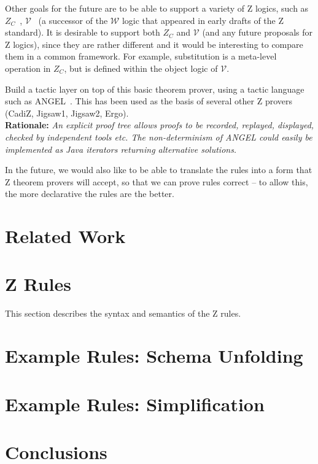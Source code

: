 \documentclass{article}
\newenvironment{Rationale}{\\ \textbf{Rationale:}\it}{}
\begin{document}
Other goals for the future are
to be able to support a variety of Z logics, such as
$Z_C$~\cite{henson:revising-z-1-99,henson:revising-z-2-99}, 
$\mathcal{V}$~\cite{brien:calculus-schemas-z00} (a successor of
the $\mathcal{W}$ logic that appeared in early drafts of the Z standard).
It is desirable to 
    support both $Z_C$ and $\mathcal{V}$ (and any future proposals for Z
    logics), since they are rather different and it would be interesting
    to compare them in a common framework.  For example, substitution
    is a meta-level operation in $Z_C$, but is defined within the object
    logic of $\mathcal{V}$.

Build a tactic layer on top of this basic theorem prover, using a
tactic language such as ANGEL~\cite{martin:tactics}.  This has been
used as the basis of several other Z provers (CadiZ, Jigsaw1, Jigsaw2,
Ergo).
  \begin{Rationale}
    An explicit proof tree allows proofs to be recorded, replayed,
    displayed, checked by independent tools etc.
    The non-determinism of ANGEL could easily be implemented as
    Java iterators returning alternative solutions.
  \end{Rationale}

In the future, we would also like to be able to translate the rules
into a form that Z theorem provers will accept, so that we can prove
rules correct -- to allow this, the more declarative the rules are the
better.

\section{Related Work}

\section{Z Rules}

This section describes the syntax and semantics of the Z rules.


\section{Example Rules: Schema Unfolding}

\section{Example Rules: Simplification}

\section{Conclusions}
\end{document}
